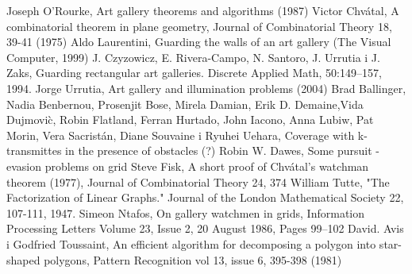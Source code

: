 \documentclass[brudnopis]{xmgr}
\theoremstyle{definition}
\begin{document}
\begin{bibdiv}
\begin{biblist}
  Joseph O'Rourke, Art gallery theorems and algorithms (1987)
  Victor Chv\'atal, A combinatorial theorem in plane geometry, Journal of Combinatorial Theory 18, 39-41 (1975)
  Aldo Laurentini, Guarding the walls of an art gallery (The Visual Computer, 1999)
  J. Czyzowicz, E. Rivera-Campo, N. Santoro, J. Urrutia i J. Zaks, Guarding rectangular art galleries. Discrete Applied Math, 50:149–157, 1994. 
  Jorge Urrutia, Art gallery and illumination problems (2004)
  Brad Ballinger, Nadia Benbernou, Prosenjit Bose, Mirela Damian, Erik D. Demaine,Vida Dujmovi\`c, Robin Flatland, Ferran Hurtado, John Iacono, Anna Lubiw, Pat Morin, Vera Sacristán, Diane Souvaine i Ryuhei Uehara, Coverage with k-transmittes in the presence of obstacles (?)
  Robin W. Dawes, Some pursuit - evasion problems on grid
  Steve Fisk, A short proof of Chv\'atal's watchman theorem (1977), Journal of Combinatorial Theory 24, 374 
  William Tutte, "The Factorization of Linear Graphs." Journal of the London Mathematical Society 22, 107-111, 1947.
  Simeon Ntafos, On gallery watchmen in grids, Information Processing Letters Volume 23, Issue 2, 20 August 1986, Pages 99–102
  David. Avis i Godfried Toussaint, An efficient algorithm for decomposing a polygon into star-shaped polygons, Pattern Recognition vol 13, issue 6, 395-398 (1981)

\end{biblist}
\end{bibdiv}

\listoffigures

\oswiadczenie
\end{document}
